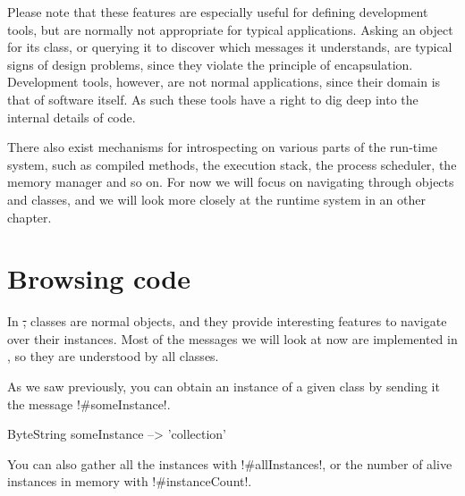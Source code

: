 \documentclass[a4paper,10pt,twoside]{book}
\begin{document}
Please note that these features are especially useful for defining development tools, but are normally not appropriate for typical applications.
Asking an object for its class, or querying it to discover which messages it understands, are typical signs of design problems, since they violate the principle of encapsulation.
Development tools, however, are not normal applications, since their domain is that of software itself. As such these tools have a right to dig deep into the internal details of code.



There also exist mechanisms for introspecting on various parts of the run-time system, such as compiled methods, the execution stack, the process scheduler, the memory manager and so on. For now we will focus on navigating through objects and classes, and we will look more closely at the runtime system in an other chapter.


\section{Browsing code} %

In \st, classes are normal objects, and they provide interesting features to navigate over their instances.
Most of the messages we will look at now are implemented in , so they are understood by all classes.

As we saw previously, you can obtain an instance of a given class by sending it the message \ct!#someInstance!.

\begin{code}{} %
ByteString someInstance --> 'collection'
\end{code}

You can also gather all the instances with \ct!#allInstances!, or the number of alive instances in memory with \ct!#instanceCount!.
\end{document}
